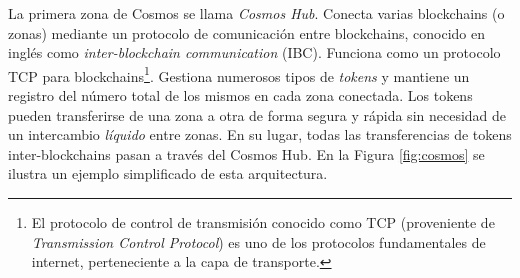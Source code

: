

La primera zona de Cosmos se llama \emph{Cosmos Hub}.
%
Conecta varias blockchains (o zonas) mediante un protocolo de comunicación entre blockchains, conocido en inglés
como \emph{inter-blockchain communication} (IBC).
Funciona como un protocolo TCP para blockchains\footnote{El protocolo de control de transmisión conocido como
TCP (proveniente de \emph{Transmission Control Protocol}) es uno de los protocolos fundamentales de internet,
perteneciente a la capa de transporte.}.
%
Gestiona numerosos tipos de \emph{tokens} y mantiene un registro del número total de los mismos en cada zona conectada.
%
Los tokens pueden transferirse de una zona a otra de forma segura y rápida sin necesidad de un intercambio \emph{líquido} entre zonas.
%
En su lugar, todas las transferencias de tokens inter-blockchains pasan a través del Cosmos Hub.
%
En la Figura \ref{fig:cosmos} se ilustra un ejemplo simplificado de esta arquitectura.


